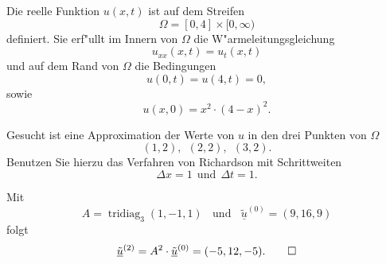Die reelle Funktion $u(x,t)$ ist auf dem Streifen
\[
\Omega = [0, 4] \times [0,\infty)
\]
definiert. Sie erf"ullt im Innern von $\Omega$ die W"armeleitungsgleichung
\[
u_{xx}(x,t) = u_{t}(x,t)
\]
und auf dem Rand von $\Omega$ die Bedingungen
\[
u(0,t) = u(4,t) = 0,
\]
sowie
\[
u(x,0) = x^2 \cdot (4-x)^2.
\]
\vspace{1mm}

Gesucht ist eine Approximation der Werte von $u$ in den drei Punkten von
$\Omega$
\[
(1,2), \ \  (2,2), \ \ (3,2).
\]
Benutzen Sie hierzu das Verfahren von Richardson mit Schrittweiten
\[
\Delta x = 1 \ \ \text{und} \ \  \Delta t = 1.
\]

\begin{loesung}
Mit
\[
A = \operatorname{tridiag}_3(1,-1,1) \ \ \ \ \text{und}  \ \ \ \ \underline{\tilde u}^{(0)} = (9, 16, 9)
\]
folgt
\[
\underline{\tilde u}^{(2)} = A^2 \cdot \underline{\tilde u}^{(0)} = (-5, 12, -5).
\qedhere
\]
\end{loesung}

